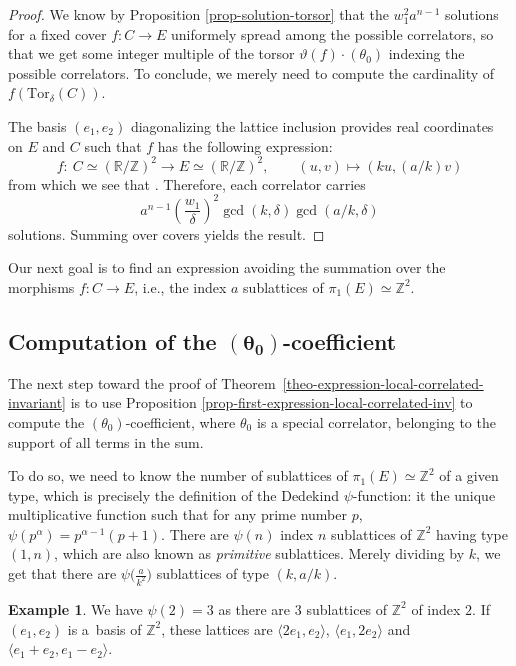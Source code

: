 \documentclass[11pt]{article}
\numberwithin{equation}{section}
\newcommand{\Tor}{\mathrm{Tor}}
\newcommand{\ZZ}{\mathbb{Z}}
\newcommand{\RR}{\mathbb{R}}
\numberwithin{equation}{section}
\theoremstyle{definition}
\newtheorem{expl}[theo]{Example}
\begin{document}
\begin{proof}
We know by Proposition \ref{prop-solution-torsor} that the $w_1^2 a^{n-1}$ solutions for a fixed cover $f\colon C\to E$ uniformely spread among the possible correlators, so that we get some integer multiple of the torsor $\vartheta(f)\cdot(\theta_0)$ indexing the possible correlators. To conclude, we merely need to compute the cardinality of $f(\Tor_\delta(C))$.

The basis $(e_1,e_2)$ diagonalizing the lattice inclusion provides real coordinates on $E$ and $C$ such that $f$ has the following expression:
\[
f \colon \ C\simeq (\RR/\ZZ)^2 \longrightarrow E\simeq (\RR/\ZZ)^2, \qquad
 (u,v) \longmapsto (ku,(a/k)v )
 \]
from which we see that \smash{$|f(\Tor_\delta(C))|=\frac{\delta^2}{\gcd(k,\delta)\gcd(a/k,\delta)}$}. Therefore, each correlator carries
\[
a^{n-1}\left(\frac{w_1}{\delta}\right)^2\gcd(k,\delta)\gcd(a/k,\delta)
\]
 solutions. Summing over covers yields the result.
\end{proof}

Our next goal is to find an expression avoiding the summation over the morphisms $f\colon C\to E$, i.e., the index $a$ sublattices of $\pi_1(E)\simeq\ZZ^2$.



\subsection[Computation of the (theta\_0)-coefficient]{Computation of the $\boldsymbol{(\theta_0)}$-coefficient}
\label{sec-0-coeff}

The next step toward the proof of Theorem~\ref{theo-expression-local-correlated-invariant} is to use Proposition \ref{prop-first-expression-local-correlated-inv} to compute the $(\theta_0)$-coefficient, where $\theta_0$ is a special correlator, belonging to the support of all terms in the sum.

To do so, we need to know the number of sublattices of $\pi_1(E)\simeq\ZZ^2$ of a given type, which is precisely the definition of the Dedekind $\psi$-function: it the unique multiplicative function such that for any prime number $p$, $\psi(p^\alpha)=p^{\alpha-1}(p+1)$. There are $\psi(n)$ index $n$ sublattices of $\ZZ^2$ having type $(1,n)$, which are also known as \textit{primitive} sublattices. Merely dividing by $k$, we get that there are $\psi\bigl(\frac{a}{k^2}\bigr)$ sublattices of type $(k,a/k)$.

\begin{expl}
We have $\psi(2)=3$ as there are $3$ sublattices of $\ZZ^2$ of index $2$. If $(e_1,e_2)$ is a~basis of $\ZZ^2$, these lattices are $\langle 2e_1,e_2\rangle$, $\langle e_1,2e_2\rangle$ and $\langle e_1+e_2,e_1-e_2\rangle$.
\end{expl}
\end{document}
